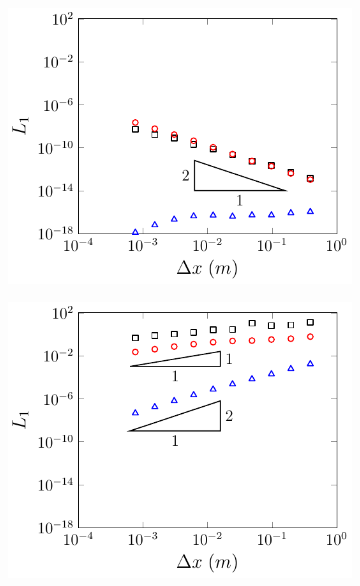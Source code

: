 \begin{figure}
	\centering
	\begin{subfigure}{0.5\textwidth}
		\includegraphics[width=\textwidth]{./chp5/figures/Analytic/LakeAtRest/L1/FEVMWB.pdf}
		\vspace{0.3cm}
	\end{subfigure}%
	\begin{subfigure}{0.5\textwidth}
		\includegraphics[width=\textwidth]{./chp5/figures/Analytic/LakeAtRest/L1/FEVMnWB.pdf}
		\vspace{0.3cm}

\end{subfigure}
\end{figure}
